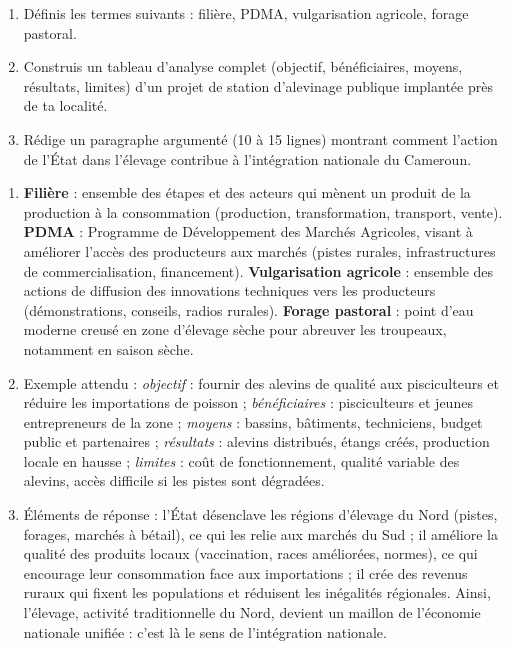 \documentclass[11pt]{article}
\begin{document}
\begin{exercice}
\begin{enumerate}
\item Définis les termes suivants : filière, PDMA, vulgarisation agricole, forage pastoral.
\item Construis un tableau d'analyse complet (objectif, bénéficiaires, moyens, résultats, limites) d'un projet de station d'alevinage publique implantée près de ta localité.
\item Rédige un paragraphe argumenté (10 à 15 lignes) montrant comment l'action de l'État dans l'élevage contribue à l'intégration nationale du Cameroun.
\end{enumerate}
\end{exercice}

\begin{corrige}[Exercice]
\begin{enumerate}
\item \textbf{Filière} : ensemble des étapes et des acteurs qui mènent un produit de la production à la consommation (production, transformation, transport, vente). \textbf{PDMA} : Programme de Développement des Marchés Agricoles, visant à améliorer l'accès des producteurs aux marchés (pistes rurales, infrastructures de commercialisation, financement). \textbf{Vulgarisation agricole} : ensemble des actions de diffusion des innovations techniques vers les producteurs (démonstrations, conseils, radios rurales). \textbf{Forage pastoral} : point d'eau moderne creusé en zone d'élevage sèche pour abreuver les troupeaux, notamment en saison sèche.
\item Exemple attendu : \emph{objectif} : fournir des alevins de qualité aux pisciculteurs et réduire les importations de poisson ; \emph{bénéficiaires} : pisciculteurs et jeunes entrepreneurs de la zone ; \emph{moyens} : bassins, bâtiments, techniciens, budget public et partenaires ; \emph{résultats} : alevins distribués, étangs créés, production locale en hausse ; \emph{limites} : coût de fonctionnement, qualité variable des alevins, accès difficile si les pistes sont dégradées.
\item Éléments de réponse : l'État désenclave les régions d'élevage du Nord (pistes, forages, marchés à bétail), ce qui les relie aux marchés du Sud ; il améliore la qualité des produits locaux (vaccination, races améliorées, normes), ce qui encourage leur consommation face aux importations ; il crée des revenus ruraux qui fixent les populations et réduisent les inégalités régionales. Ainsi, l'élevage, activité traditionnelle du Nord, devient un maillon de l'économie nationale unifiée : c'est là le sens de l'intégration nationale.
\end{enumerate}
\end{corrige}
\end{document}
